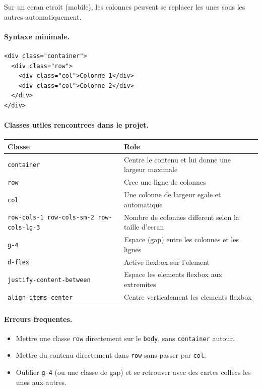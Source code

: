 \documentclass[11pt,a4paper]{article}
\begin{document}
Sur un ecran etroit (mobile), les colonnes peuvent se replacer les unes
sous les autres automatiquement.

\paragraph{Syntaxe minimale.}

\begin{lstlisting}
<div class="container">
  <div class="row">
    <div class="col">Colonne 1</div>
    <div class="col">Colonne 2</div>
  </div>
</div>
\end{lstlisting}

\paragraph{Classes utiles rencontrees dans le projet.}

\begin{longtable}{|p{4cm}|p{9cm}|}
\hline
\textbf{Classe} & \textbf{Role} \\
\hline
\verb|container| & Centre le contenu et lui donne une largeur maximale \\
\hline
\verb|row| & Cree une ligne de colonnes \\
\hline
\verb|col| & Une colonne de largeur egale et automatique \\
\hline
\verb|row-cols-1 row-cols-sm-2 row-cols-lg-3| & Nombre de colonnes different selon la taille d'ecran \\
\hline
\verb|g-4| & Espace (gap) entre les colonnes et les lignes \\
\hline
\verb|d-flex| & Active flexbox sur l'element \\
\hline
\verb|justify-content-between| & Espace les elements flexbox aux extremites \\
\hline
\verb|align-items-center| & Centre verticalement les elements flexbox \\
\hline
\end{longtable}

\paragraph{Erreurs frequentes.}
\begin{itemize}
  \item Mettre une classe \verb|row| directement sur le \verb|body|, sans
  \verb|container| autour.
  \item Mettre du contenu directement dans \verb|row| sans passer par
  \verb|col|.
  \item Oublier \verb|g-4| (ou une classe de gap) et se retrouver avec des
  cartes collees les unes aux autres.
\end{itemize}
\end{document}

